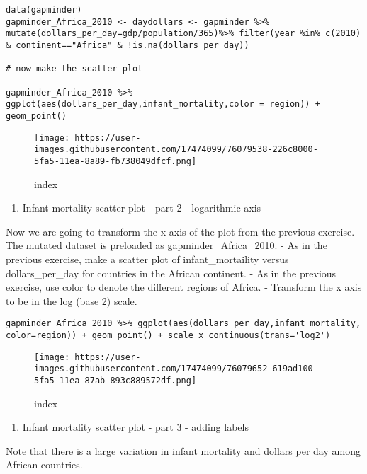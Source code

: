 \documentclass[]{article}
\providecommand{\tightlist}{%
  \setlength{\itemsep}{0pt}\setlength{\parskip}{0pt}}
\begin{document}
\begin{verbatim}
data(gapminder)
gapminder_Africa_2010 <- daydollars <- gapminder %>% mutate(dollars_per_day=gdp/population/365)%>% filter(year %in% c(2010) & continent=="Africa" & !is.na(dollars_per_day))

# now make the scatter plot

gapminder_Africa_2010 %>% ggplot(aes(dollars_per_day,infant_mortality,color = region)) + geom_point()
\end{verbatim}

\begin{figure}
\centering
\texttt{[image: https://user-images.githubusercontent.com/17474099/76079538-226c8000-5fa5-11ea-8a89-fb738049dfcf.png]}
\caption{index}
\end{figure}

\begin{enumerate}
\def\labelenumi{\arabic{enumi}.}
\setcounter{enumi}{11}
\tightlist
\item
  Infant mortality scatter plot - part 2 - logarithmic axis
\end{enumerate}

Now we are going to transform the x axis of the plot from the previous
exercise. - The mutated dataset is preloaded as gapminder\_Africa\_2010.
- As in the previous exercise, make a scatter plot of infant\_mortaility
versus dollars\_per\_day for countries in the African continent. - As in
the previous exercise, use color to denote the different regions of
Africa. - Transform the x axis to be in the log (base 2) scale.

\begin{verbatim}
gapminder_Africa_2010 %>% ggplot(aes(dollars_per_day,infant_mortality, color=region)) + geom_point() + scale_x_continuous(trans='log2')
\end{verbatim}

\begin{figure}
\centering
\texttt{[image: https://user-images.githubusercontent.com/17474099/76079652-619ad100-5fa5-11ea-87ab-893c889572df.png]}
\caption{index}
\end{figure}

\begin{enumerate}
\def\labelenumi{\arabic{enumi}.}
\setcounter{enumi}{12}
\tightlist
\item
  Infant mortality scatter plot - part 3 - adding labels
\end{enumerate}

Note that there is a large variation in infant mortality and dollars per
day among African countries.
\end{document}
